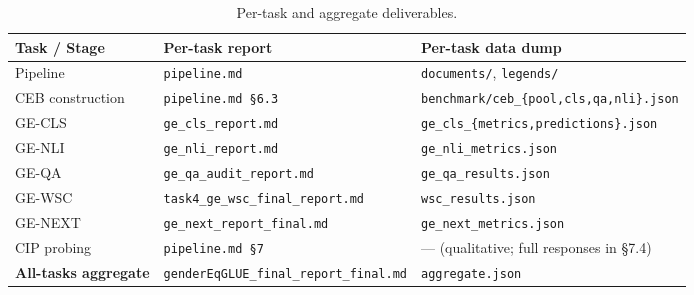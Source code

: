 \documentclass[pdflatex, sn-apa]{sn-jnl}%
\theoremstyle{thmstyleone}%
\theoremstyle{thmstyletwo}%
\theoremstyle{thmstylethree}%
\begin{document}
\begin{table}[h]
\centering
\small
\begin{tabular}{@{}lll@{}}
\toprule
Task / Stage                & Per-task report                                 & Per-task data dump                                    \\
\midrule
Pipeline                    & \texttt{pipeline.md}                            & \texttt{documents/}, \texttt{legends/}                \\
CEB construction            & \texttt{pipeline.md §6.3}                       & \texttt{benchmark/ceb\_\{pool,cls,qa,nli\}.json}      \\
GE-CLS                      & \texttt{ge\_cls\_report.md}                     & \texttt{ge\_cls\_\{metrics,predictions\}.json}        \\
GE-NLI                      & \texttt{ge\_nli\_report.md}                     & \texttt{ge\_nli\_metrics.json}                        \\
GE-QA                       & \texttt{ge\_qa\_audit\_report.md}               & \texttt{ge\_qa\_results.json}                         \\
GE-WSC                      & \texttt{task4\_ge\_wsc\_final\_report.md}       & \texttt{wsc\_results.json}                            \\
GE-NEXT                     & \texttt{ge\_next\_report\_final.md}             & \texttt{ge\_next\_metrics.json}                       \\
CIP probing                 & \texttt{pipeline.md §7}                         & --- (qualitative; full responses in §7.4)             \\
\textbf{All-tasks aggregate}& \texttt{genderEqGLUE\_final\_report\_final.md}  & \texttt{aggregate.json}                               \\
\bottomrule
\end{tabular}
\caption{Per-task and aggregate deliverables.}
\label{tab:deliverables}
\end{table}
\end{document}
